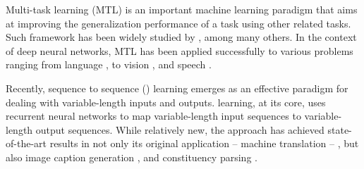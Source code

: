 Multi-task learning (MTL) is an important machine learning paradigm that
aims at improving the generalization performance of a task using other related
tasks. 
Such framework has been widely studied by
, among many
others. In the context of deep neural networks, MTL has
been applied successfully to various problems ranging from language
\cite{liu15}, to vision
\cite{donahue14},
and speech \cite{heigold13,huang2013cross}.

\begin{sloppypar}
Recently, sequence to sequence (\ssl{}) learning
\cite{kal13,sutskever14,cho14} emerges as an effective paradigm for dealing with
variable-length inputs and outputs. \ssl{} learning, at its core, uses
recurrent neural networks to map variable-length input sequences to
variable-length output sequences.  While relatively new, the \ssl{}
approach has achieved state-of-the-art results in not only its original
application -- machine translation --
\cite{luong15,jean15,luong15attn,jean15wmt,luong15iwslt}, but also image caption generation \cite{vinyals15caption},
and constituency parsing \cite{vinyals15grammar}. 
\end{sloppypar}

